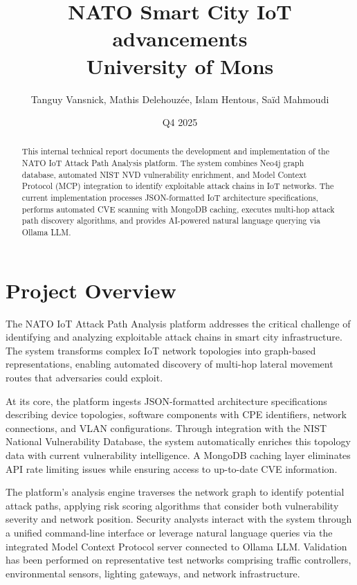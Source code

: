 \documentclass[11pt,a4paper]{article}
\title{\textbf{NATO Smart City IoT advancements}\\
\large University of Mons}
\author{Tanguy Vansnick, Mathis Delehouzée, Islam Hentous, Saïd Mahmoudi}
\date{Q4 2025}
\begin{document}
\maketitle
\begin{abstract}
This internal technical report documents the development and implementation of the NATO IoT Attack Path Analysis platform. The system combines Neo4j graph database, automated NIST NVD vulnerability enrichment, and Model Context Protocol (MCP) integration to identify exploitable attack chains in IoT networks. The current implementation processes JSON-formatted IoT architecture specifications, performs automated CVE scanning with MongoDB caching, executes multi-hop attack path discovery algorithms, and provides AI-powered natural language querying via Ollama LLM.
\end{abstract}

\section{Project Overview}

The NATO IoT Attack Path Analysis platform addresses the critical challenge of identifying and analyzing exploitable attack chains in smart city infrastructure. The system transforms complex IoT network topologies into graph-based representations, enabling automated discovery of multi-hop lateral movement routes that adversaries could exploit.

At its core, the platform ingests JSON-formatted architecture specifications describing device topologies, software components with CPE identifiers, network connections, and VLAN configurations. Through integration with the NIST National Vulnerability Database, the system automatically enriches this topology data with current vulnerability intelligence. A MongoDB caching layer eliminates API rate limiting issues while ensuring access to up-to-date CVE information.

The platform's analysis engine traverses the network graph to identify potential attack paths, applying risk scoring algorithms that consider both vulnerability severity and network position. Security analysts interact with the system through a unified command-line interface or leverage natural language queries via the integrated Model Context Protocol server connected to Ollama LLM. Validation has been performed on representative test networks comprising traffic controllers, environmental sensors, lighting gateways, and network infrastructure.
\end{document}
